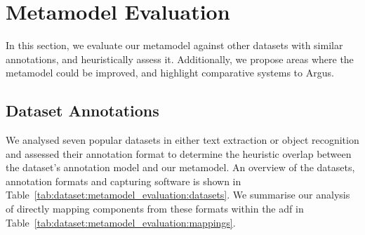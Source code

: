 \section{Metamodel Evaluation}
\label{sec:dataset:metamodel_evaluation}

In this section, we evaluate our metamodel against other datasets with similar annotations, and heuristically assess it. Additionally, we propose areas where the metamodel could be improved, and highlight comparative systems to Argus.

\subsection{Dataset Annotations}
\label{sec:dataset:metamodel_evaluation:annotations}

We analysed seven popular datasets in either text extraction or object recognition and assessed their annotation format to determine the heuristic overlap between the dataset's annotation model and our metamodel. An overview of the datasets, annotation formats and capturing software is shown in Table~\ref{tab:dataset:metamodel_evaluation:datasets}. We summarise our analysis of directly mapping components from these formats within the \gls{adf} in Table~\ref{tab:dataset:metamodel_evaluation:mappings}.

